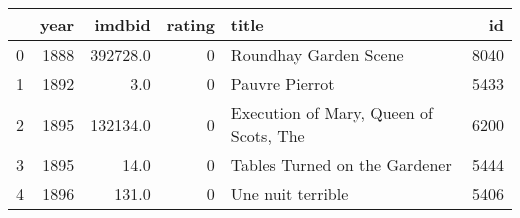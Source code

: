 \begin{tabular}{lrrrlr}
\toprule
{} &  year &    imdbid &  rating &                                   title &    id \\
\midrule
0 &  1888 &  392728.0 &       0 &                   Roundhay Garden Scene &  8040 \\
1 &  1892 &       3.0 &       0 &                          Pauvre Pierrot &  5433 \\
2 &  1895 &  132134.0 &       0 &  Execution of Mary, Queen of Scots, The &  6200 \\
3 &  1895 &      14.0 &       0 &           Tables Turned on the Gardener &  5444 \\
4 &  1896 &     131.0 &       0 &                       Une nuit terrible &  5406 \\
\bottomrule
\end{tabular}
